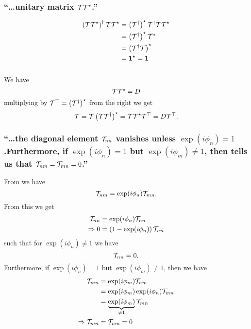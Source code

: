 \subsubsection{\enquote{\dots \textbf{unitary} matrix $\mathcal{T} \mathcal{T}^\star$.} }
\begin{align*}
	\left(\mathcal{T} \mathcal{T}^\star\right)^\dagger \mathcal{T} \mathcal{T}^\star&=\left(\mathcal{T}^\dagger\right)^\star \mathcal{T}^\dagger \mathcal{T} \mathcal{T}^\star\\
	&=\left(\mathcal{T}^\dagger\right)^\star\mathcal{T}^\star\\
	&=\left(\mathcal{T}^\dagger\mathcal{T}\right)^\star\\
	&=\mathbf{1}^\star=\mathbf{1}
\end{align*}

\subsubsection{ }
We have \[\mathcal{T}\mathcal{T}^\star=D\]
multiplying by $\mathcal{T}^\top=\left(\mathcal{T}^\dagger\right)^\star$ from the right we get
\[\mathcal{T}=\mathcal{T}\left(\mathcal{T}\mathcal{T}^\dagger\right)^\star=\mathcal{T}\mathcal{T}^\star\mathcal{T}^\top=D\mathcal{T}^\top.\]

\subsubsection{\enquote{\dots the diagonal element $\mathcal{T}_{nn}$ vanishes unless $\exp(i\phi_n)=1$.Furthermore, if $\exp(i\phi_n)=1$ but $\exp(i\phi_m)\neq1$, then  tells us that $\mathcal{T}_{nm}=\mathcal{T}_{mn}=0$.} }

From  we have
\[\mathcal{T}_{nm}=\exp(i\phi_n)\mathcal{T}_{mn}.\]
From this we get
\begin{align*}
	\mathcal{T}_{nn}&=\exp(i\phi_n)\mathcal{T}_{nn}\\
	\Rightarrow 0&=\left(1-\exp(i\phi_n)\right)\mathcal{T}_{nn}
\end{align*}
such that for $\exp(i\phi_n)\neq1$ we have \[\mathcal{T}_{nn}=0.\]
Furthermore, if $\exp(i\phi_n)=1$ but $\exp(i\phi_m)\neq1$, then we have
\begin{align*}
	\mathcal{T}_{mn}&=\exp(i\phi_m)\mathcal{T}_{nm}\\
	&=\exp(i\phi_m)\exp(i\phi_n)\mathcal{T}_{mn}\\
	&=\underbrace{\exp(i\phi_m)}_{\neq1}\mathcal{T}_{mn}\\
	\Rightarrow \mathcal{T}_{mn}&=\mathcal{T}_{nm}=0
\end{align*}

